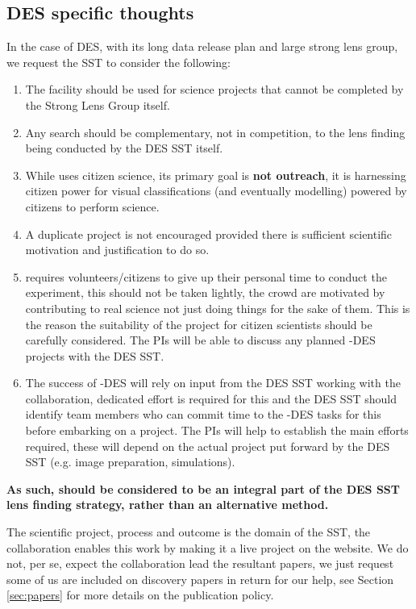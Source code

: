 \documentclass[a4paper,twocolumn]{article}
\begin{document}
\subsection{DES specific thoughts}
In the case of DES, with its long data release plan and large strong lens group, we request the SST to consider the following:
\begin{enumerate}
\item The \SW facility should be used for science projects that cannot be completed by the Strong Lens Group itself. 
\item Any \SW search should be complementary, not in competition, to the lens finding being conducted by the DES SST itself.
\item While \SW uses citizen science, its primary goal is \textbf{not outreach}, it is harnessing citizen power for visual classifications (and eventually modelling) powered by citizens to perform science.
\item A duplicate project is not encouraged provided there is sufficient scientific motivation and justification to do so.
\item \SW requires volunteers/citizens to give up their personal time to conduct the experiment, this should not be taken lightly, the crowd are motivated by contributing to real science not just doing things for the sake of them. This is the reason the suitability of the project for citizen scientists should be carefully considered. The \SW PIs will be able to discuss any planned \SW-DES projects with the DES SST.
\item The success of \SW-DES will rely on input from the DES SST working with the \SW collaboration, dedicated effort is required for this and the DES SST should identify team members who can commit time to the \SW-DES tasks for this before embarking on a project. The \SW PIs will help to establish the main efforts required, these will depend on the actual project put forward by the DES SST (e.g. image preparation, simulations).
\end{enumerate}

\textbf{As such, \SW should be considered to be an integral part of the DES SST lens finding strategy, rather than an alternative method.}

The scientific project, process and outcome is the domain of the SST, the \SW collaboration enables this work by making it a live project on the website. We do not, per se, expect the \SW collaboration lead the resultant papers, we just request some of us are included on discovery papers in return for our help, see Section \ref{sec:papers} for more details on the publication policy.
\end{document}

